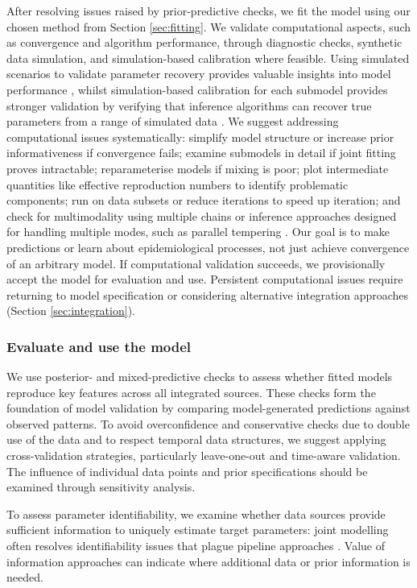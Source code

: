 \documentclass{article}
\begin{document}
After resolving issues raised by prior-predictive checks, we fit the model using our chosen method from Section \ref{sec:fitting}. We validate computational aspects, such as convergence and algorithm performance, through diagnostic checks, synthetic data simulation, and simulation-based calibration where feasible.
Using simulated scenarios to validate parameter recovery provides valuable insights into model performance \citep{bouman2024bayesian}, whilst simulation-based calibration for each submodel provides stronger validation by verifying that inference algorithms can recover true parameters from a range of simulated data \citep{talts2018validating}.
We suggest addressing computational issues systematically: simplify model structure or increase prior informativeness if convergence fails; examine submodels in detail if joint fitting proves intractable; reparameterise models if mixing is poor; plot intermediate quantities like effective reproduction numbers to identify problematic components; run on data subsets or reduce iterations to speed up iteration; and check for multimodality using multiple chains or inference approaches designed for handling multiple modes, such as parallel tempering \citep{gelman2020bayesian}.
Our goal is to make predictions or learn about epidemiological processes, not just achieve convergence of an arbitrary model. 
If computational validation succeeds, we provisionally accept the model for evaluation and use.
Persistent computational issues require returning to model specification or considering alternative integration approaches (Section \ref{sec:integration}).

\subsubsection{Evaluate and use the model}

We use posterior- and mixed-predictive checks \citep{rubin1984bayesianly,gelman1995bayesian} to assess whether fitted models reproduce key features across all integrated sources.
These checks form the foundation of model validation by comparing model-generated predictions against observed patterns.
To avoid overconfidence and conservative checks due to double use of the data and to respect temporal data structures, we suggest applying cross-validation strategies, particularly leave-one-out and time-aware validation.
The influence of individual data points and prior specifications should be examined through sensitivity analysis.

To assess parameter identifiability, we examine whether data sources provide sufficient information to uniquely estimate target parameters: joint modelling often resolves identifiability issues that plague pipeline approaches \citep{lison2024generative, russell2024combined}. Value of information approaches \citep{jackson2019value,heath2024value} can indicate where additional data or prior information is needed.  
\end{document}
